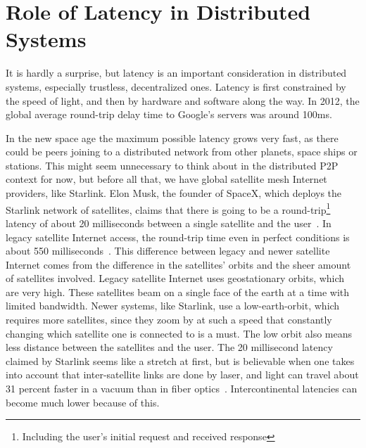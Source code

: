 \section{Role of Latency in Distributed Systems}
It is hardly a surprise, but latency is an important consideration in distributed systems, especially trustless, decentralized ones. Latency is first constrained by the speed of light, and then by hardware and software along the way. In 2012, the global average round-trip delay time to Google's servers was around 100ms.~\cite{Grigorik_undated-mc}

In the new space age the maximum possible latency grows very fast, as there could be peers joining to a distributed network from other planets, space ships or stations. This might seem unnecessary to think about in the distributed P2P context for now, but before all that, we have global satellite mesh Internet providers, like Starlink. Elon Musk, the founder of SpaceX, which deploys the Starlink network of satellites, claims that there is going to be a round-trip\footnote{Including the user's initial request and received response} latency of about 20 milliseconds between a single satellite and the user~\cite{Tung_undated-ny}. In legacy satellite Internet access, the round-trip time even in perfect conditions is about 550 milliseconds~\cite{noauthor_undated-zc}. This difference between legacy and newer satellite Internet comes from the difference in the satellites' orbits and the sheer amount of satellites involved. Legacy satellite Internet uses geostationary orbits, which are very high. These satellites beam on a single face of the earth at a time with limited bandwidth. Newer systems, like Starlink, use a low-earth-orbit, which requires more satellites, since they zoom by at such a speed that constantly changing which satellite one is connected to is a must. The low orbit also means less distance between the satellites and the user. The 20 millisecond latency claimed by Starlink seems like a stretch at first, but is believable when one takes into account that inter-satellite links are done by laser, and light can travel about 31 percent faster in a vacuum than in fiber optics~\cite{Finley2013-wt}. Intercontinental latencies can become much lower because of this.

